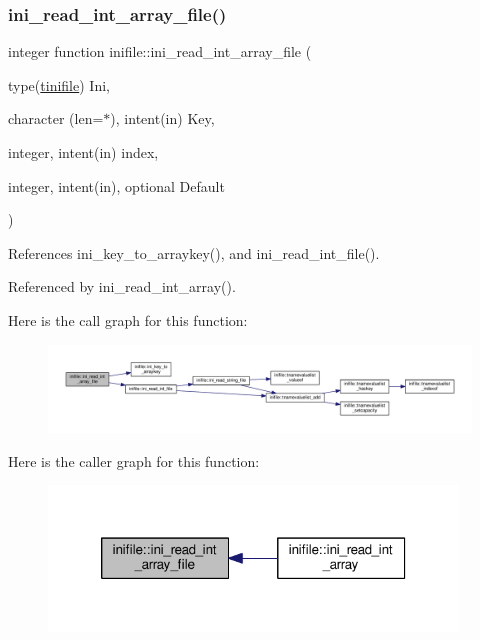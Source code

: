 \subsubsection{\texorpdfstring{ini\+\_\+read\+\_\+int\+\_\+array\+\_\+file()}{ini\_read\_int\_array\_file()}}
{\footnotesize\ttfamily integer function inifile\+::ini\+\_\+read\+\_\+int\+\_\+array\+\_\+file (\begin{DoxyParamCaption}\item[{type(\mbox{\hyperlink{structinifile_1_1tinifile}{tinifile}})}]{Ini,  }\item[{character (len=$\ast$), intent(in)}]{Key,  }\item[{integer, intent(in)}]{index,  }\item[{integer, intent(in), optional}]{Default }\end{DoxyParamCaption})}



References ini\+\_\+key\+\_\+to\+\_\+arraykey(), and ini\+\_\+read\+\_\+int\+\_\+file().



Referenced by ini\+\_\+read\+\_\+int\+\_\+array().

Here is the call graph for this function\+:
\nopagebreak
\begin{figure}[H]
\begin{center}
\leavevmode
\includegraphics[width=350pt]{namespaceinifile_a327aeaeeb0b796b9b97cdae69147b0d6_cgraph}
\end{center}
\end{figure}
Here is the caller graph for this function\+:
\nopagebreak
\begin{figure}[H]
\begin{center}
\leavevmode
\includegraphics[width=308pt]{namespaceinifile_a327aeaeeb0b796b9b97cdae69147b0d6_icgraph}
\end{center}
\end{figure}
\mbox{\label{namespaceinifile_a86f5e6c25d72652fcacf21732f33ea27}} 
